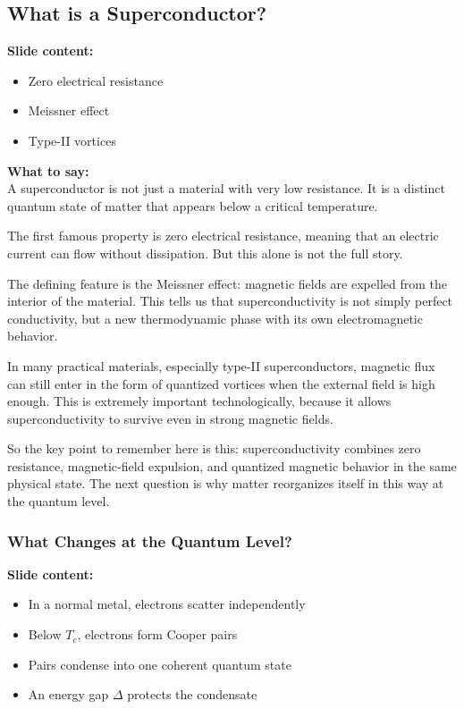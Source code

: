 \documentclass[11pt,a4paper]{article}
\newcommand{\points}[1]{{\color{accent}\textbf{Slide content:}}\\#1}
\newcommand{\speech}[1]{{\color{accent}\textbf{What to say:}}\\#1}
\begin{document}

\subsection{What is a Superconductor?}

\points{
\begin{itemize}
\item Zero electrical resistance
\item Meissner effect
\item Type-II vortices
\end{itemize}
}

\speech{
A superconductor is not just a material with very low resistance. It is a distinct quantum state of matter that appears below a critical temperature.

The first famous property is zero electrical resistance, meaning that an electric current can flow without dissipation. But this alone is not the full story.

The defining feature is the Meissner effect: magnetic fields are expelled from the interior of the material. This tells us that superconductivity is not simply perfect conductivity, but a new thermodynamic phase with its own electromagnetic behavior.

In many practical materials, especially type-II superconductors, magnetic flux can still enter in the form of quantized vortices when the external field is high enough. This is extremely important technologically, because it allows superconductivity to survive even in strong magnetic fields.

So the key point to remember here is this: superconductivity combines zero resistance, magnetic-field expulsion, and quantized magnetic behavior in the same physical state. The next question is why matter reorganizes itself in this way at the quantum level.
}


\subsubsection{What Changes at the Quantum Level?}

\points{
\begin{itemize}
\item In a normal metal, electrons scatter independently
\item Below \(T_c\), electrons form Cooper pairs
\item Pairs condense into one coherent quantum state
\item An energy gap \(\Delta\) protects the condensate
\end{itemize}
}
\end{document}
